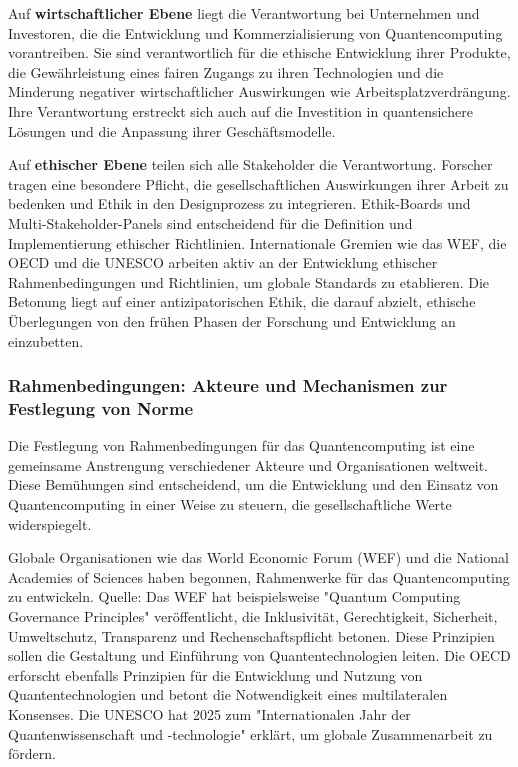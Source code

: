 Auf \textbf{wirtschaftlicher Ebene} liegt die Verantwortung bei  Unternehmen und Investoren, die die Entwicklung und Kommerzialisierung von Quantencomputing vorantreiben.\cite{noauthor_how_2025} Sie sind verantwortlich für die ethische Entwicklung ihrer Produkte, die Gewährleistung eines fairen Zugangs zu ihren Technologien und die Minderung negativer wirtschaftlicher Auswirkungen wie Arbeitsplatzverdrängung.  Ihre Verantwortung erstreckt sich auch auf die Investition in quantensichere Lösungen und die Anpassung ihrer Geschäftsmodelle.\cite{noauthor_quantum_nodate-2}\cite{noauthor_ethical_nodate} 

Auf \textbf{ethischer Ebene} teilen sich alle Stakeholder die Verantwortung. Forscher tragen eine besondere Pflicht, die gesellschaftlichen Auswirkungen ihrer Arbeit zu bedenken und Ethik in den Designprozess zu integrieren.\cite{directory_quantum_nodate-1} Ethik-Boards und Multi-Stakeholder-Panels sind entscheidend für die Definition und Implementierung ethischer Richtlinien. Internationale Gremien wie das WEF, die OECD und die UNESCO arbeiten aktiv an der Entwicklung ethischer Rahmenbedingungen und Richtlinien, um globale Standards zu etablieren. Die Betonung liegt auf einer antizipatorischen Ethik, die darauf abzielt, ethische Überlegungen von den frühen Phasen der Forschung und Entwicklung an einzubetten.\cite{noauthor_quantum_nodate-7}\cite{noauthor_participate_nodate}

\subsubsection{Rahmenbedingungen: Akteure und Mechanismen zur Festlegung von Norme}
Die Festlegung von Rahmenbedingungen für das Quantencomputing ist eine gemeinsame Anstrengung verschiedener Akteure und Organisationen weltweit. Diese Bemühungen sind entscheidend, um die Entwicklung und den Einsatz von Quantencomputing in einer Weise zu steuern, die gesellschaftliche Werte widerspiegelt.

Globale Organisationen wie das World Economic Forum (WEF) und die National Academies of Sciences haben begonnen, Rahmenwerke für das Quantencomputing zu entwickeln. Quelle: Das WEF hat beispielsweise "Quantum Computing Governance Principles" veröffentlicht, die Inklusivität, Gerechtigkeit, Sicherheit, Umweltschutz, Transparenz und Rechenschaftspflicht betonen. Diese Prinzipien sollen die Gestaltung und Einführung von Quantentechnologien leiten.\cite{noauthor_ethics_nodate} \cite{csiro_global_nodate} Die OECD erforscht ebenfalls Prinzipien für die Entwicklung und Nutzung von Quantentechnologien und betont die Notwendigkeit eines multilateralen Konsenses.\cite{noauthor_quantum_nodate-7} Die UNESCO hat 2025 zum "Internationalen Jahr der Quantenwissenschaft und -technologie" erklärt, um globale Zusammenarbeit zu fördern.\cite{noauthor_participate_nodate} 

